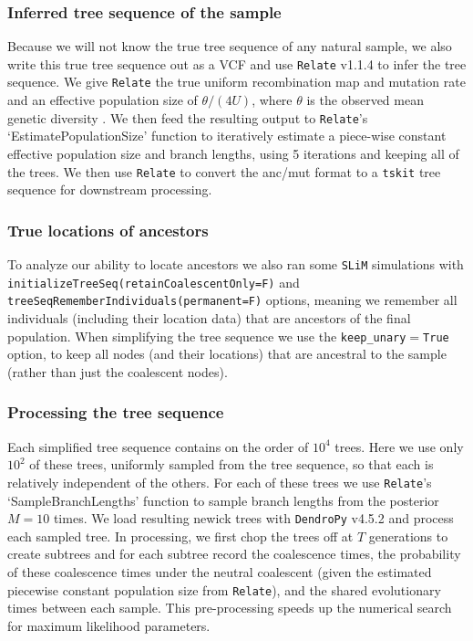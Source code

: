 \documentclass[12pt]{article}
\begin{document}
\subsubsection*{Inferred tree sequence of the sample}

Because we will not know the true tree sequence of any natural sample, we also write this true tree sequence out as a VCF and use \texttt{Relate} v1.1.4 \citep{speidel2019method} to infer the tree sequence.
We give \texttt{Relate} the true uniform recombination map and mutation rate and an effective population size of $\theta/(4U)$, where $\theta$ is the observed mean genetic diversity \citep[calculated from the tree sequence with \texttt{tskit} v0.3.5;][]{kelleher2018efficient,ralph2020efficiently}.
We then feed the resulting output to \texttt{Relate}'s `EstimatePopulationSize' function to iteratively estimate a piece-wise constant effective population size and branch lengths, using 5 iterations and keeping all of the trees.
We then use \texttt{Relate} to convert the anc/mut format to a \texttt{tskit} tree sequence for downstream processing. 

\subsubsection*{True locations of ancestors}

To analyze our ability to locate ancestors we also ran some \texttt{SLiM} simulations with \texttt{initializeTreeSeq(retainCoalescentOnly=F)} and\\ %
\texttt{treeSeqRememberIndividuals(permanent=F)} options, meaning we remember all individuals (including their location data) that are ancestors of the final population.
When simplifying the tree sequence we use the \texttt{keep\_unary$=$True} option, to keep all nodes (and their locations) that are ancestral to the sample (rather than just the coalescent nodes).

\subsubsection*{Processing the tree sequence}

Each simplified tree sequence contains on the order of $10^4$ trees.
Here we use only $10^2$ of these trees, uniformly sampled from the tree sequence, so that each is relatively independent of the others. 
For each of these trees we use \texttt{Relate}'s `SampleBranchLengths' function to sample branch lengths from the posterior $M=10$ times.
We load resulting newick trees with \texttt{DendroPy} v4.5.2 \citep{sukumaran2010dendropy} and process each sampled tree.
In processing, we first chop the trees off at $T$ generations to create subtrees and for each subtree record the coalescence times, the probability of these coalescence times under the neutral coalescent (given the estimated piecewise constant population size from \texttt{Relate}), and the shared evolutionary times between each sample. 
This pre-processing speeds up the numerical search for maximum likelihood parameters.
\end{document}
